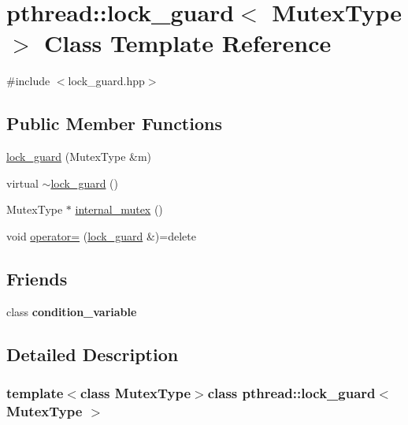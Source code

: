 \hypertarget{classpthread_1_1lock__guard}{\section{pthread\+:\+:lock\+\_\+guard$<$ Mutex\+Type $>$ Class Template Reference}
\label{classpthread_1_1lock__guard}
}


{\ttfamily \#include $<$lock\+\_\+guard.\+hpp$>$}

\subsection*{Public Member Functions}
\begin{DoxyCompactItemize}
\item 
\hyperlink{classpthread_1_1lock__guard_a5298f98a23bc7d7fe4fc9636f989ad65}{lock\+\_\+guard} (Mutex\+Type \&m)
\item 
virtual \hyperlink{classpthread_1_1lock__guard_a939eb7ef1b1b53d9603734fc6b120f76}{$\sim$lock\+\_\+guard} ()
\item 
Mutex\+Type $\ast$ \hyperlink{classpthread_1_1lock__guard_a0aeeee216e7b322845678cf59990351b}{internal\+\_\+mutex} ()
\item 
void \hyperlink{classpthread_1_1lock__guard_a1f9ab705f7ffe9eb8739ff3cf34cf7f2}{operator=} (\hyperlink{classpthread_1_1lock__guard}{lock\+\_\+guard} \&)=delete
\end{DoxyCompactItemize}
\subsection*{Friends}
\begin{DoxyCompactItemize}
\item 
\hypertarget{classpthread_1_1lock__guard_a89c9b6aa2256fa5efd92a333d96381d4}{class {\bfseries condition\+\_\+variable}}\label{classpthread_1_1lock__guard_a89c9b6aa2256fa5efd92a333d96381d4}

\end{DoxyCompactItemize}


\subsection{Detailed Description}
\subsubsection*{template$<$class Mutex\+Type$>$class pthread\+::lock\+\_\+guard$<$ Mutex\+Type $>$}

